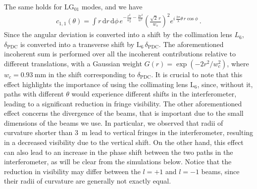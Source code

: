 \documentclass[
reprint,
amsmath,amssymb,
aps,
showkeys
]{revtex4-2}
\begin{document}
The same holds for $\mathrm{LG}_{01}$ modes, and we have
%
\begin{align}
    c_{1,1}\left(\theta\right) = 
    \int r\,\mathrm{d}r\,\mathrm{d}\phi\,
    e^{-\frac{r^2}{w_p^2}-\frac{2r^2}{w^2}}
    \left(\frac{\sqrt{2} \, r}{w_s}\right)^2
    e^{i\, \frac{2\pi}{\lambda}\theta \, r \cos{\phi}}
    \, .
\end{align}
%
Since the angular deviation is converted into a shift by the collimation lens $L_6$, $\delta_\mathrm{PDC}$ is converted into a transverse shift by $\mathrm{L}_6 \, \delta_\mathrm{PDC}$.
The aforementioned incoherent sum is performed over all the incoherent contributions relative to different translations, with a Gaussian weight $G\left(r\right) = \exp{\left( -2 r^2 / w_c^2 \right)}$, where $w_c=\SI{0.93}{\milli\meter}$ in the shift corresponding to $\delta_\mathrm{PDC}$.
It is crucial to note that this effect highlights the importance of using the collimating lens $\mathrm{L}_6$, since, without it, paths with different $\theta$ would experience different shifts in the interferometer, leading to a significant reduction in fringe visibility.
The other aforementioned effect concerns the divergence of the beams, that is important due to the small dimensions of the beams we use.
In particular, we observed that radii of curvature shorter than \SI{3}{\meter} lead to vertical fringes in the interferometer, resulting in a decreased visibility due to the vertical shift.
On the other hand, this effect can also lead to an increase in the phase shift between the two paths in the interferometer, as will be clear from the simulations below.
Notice that the reduction in visibility may differ between the $l=+1$ and $l=-1$ beams, since their radii of curvature are generally not exactly equal.
\end{document}

